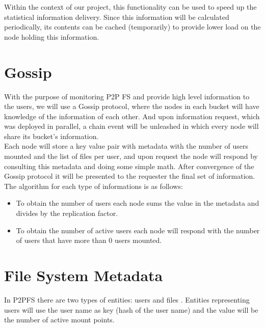 \documentclass[times,9pt,article]{llncs}
\begin{document}
Within the context of our project, this functionality can be used to speed up
the statistical information delivery. Since this information will be calculated
periodically, its contents can be cached (temporarily) to provide lower load on
the node holding this information.

\section{Gossip}

With the purpose of monitoring P2P FS and provide high level information to the 
users, we will use a Gossip protocol, where the nodes in each bucket will have 
knowledge of the information of each other. And upon information request, which
 was deployed in parallel, a chain event will be unleashed in which every node
 will share its bucket's information.\\
Each node will store a key value pair with metadata with the number of users 
mounted and the list of files per user, and upon request the node will respond 
by consulting this metadata and doing some simple math. After convergence of the
 Gossip protocol it will be presented to the requester the final set of 
 information.\\
The algorithm for each type of informations is as follows:
\begin{itemize}
\item To obtain the number of users each node sums the value in the metadata and
 divides by the replication factor.
\item To obtain the number of active users each node will respond with the number
 of users that have more than 0 users mounted.
\end{itemize} 

\section{File System Metadata}

In P2PFS there are two types of entities: users and files . Entities representing
users will use the user name as key (hash of the user name) and the value will 
be the number of active mount points. 
\end{document}
